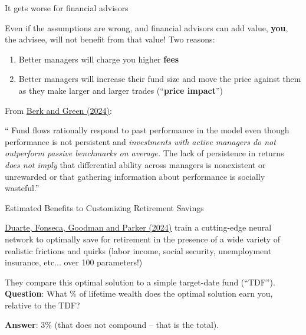 \documentclass[aspectratio=169]{beamer}
\begin{document}
\begin{frame}{It gets worse for financial advisors}

Even if the assumptions are wrong, and financial advisors can add value, \textbf{you}, the advisee, will not benefit from that value! Two reasons: \pause 
\begin{enumerate}
    \item Better managers will charge you higher \textbf{fees}
    \item Better managers will increase their fund size and move the price against them as they make larger and larger trades (``\textbf{price impact}'') 
\end{enumerate} \pause 

\vfill 
From \href{https://www.gsb.stanford.edu/faculty-research/research/publications/mutual-fund-flows-performance-rational-markets}{Berk and Green (2024)}: 

`` Fund flows rationally respond to past performance in the model even though performance is not persistent and \emph{investments with active managers do not outperform passive benchmarks on average.} \pause The lack of persistence in returns \emph{does not imply} that differential ability across managers is nonexistent or unrewarded or that gathering information about performance is socially wasteful.'' 
    
\end{frame}


\begin{frame}{Estimated Benefits to Customizing Retirement Savings}

\href{https://mitsloan.mit.edu/shared/ods/documents?PublicationDocumentID=10586}{Duarte, Fonseca, Goodman and Parker (2024)} train a cutting-edge neural network to optimally save for retirement in the presence of a wide variety of realistic frictions and quirks (labor income, social security, unemployment insurance, etc... over 100 parameters!) 

\vfill \pause 

They compare this optimal solution to a simple target-date fund (``TDF''). \\ 
\textbf{Question}: What \% of lifetime wealth does the optimal solution earn you, relative to the TDF? 

\vfill \pause 

\textbf{Answer}: 3\% (that does not compound -- that is the total). 

    
\end{frame}
\end{document}
